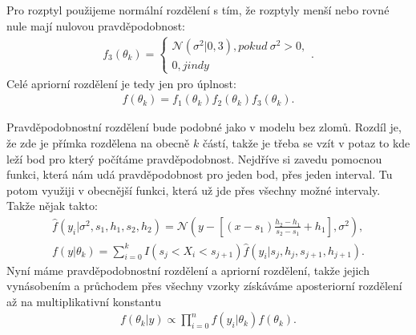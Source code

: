 \documentclass[czech,master,public,dept470,male,cpdeclaration,oneside, python]{diploma}
\begin{document}
Pro rozptyl použijeme normální rozdělení s tím, že rozptyly menší nebo rovné nule mají nulovou pravděpodobnost:
\begin{align}
f_3(\theta_k) = 
\begin{cases}
\mathcal{N}(\sigma^2 | 0, 3), pokud\  \sigma^2 > 0, \\
0, jindy
\end{cases}.
\end{align}
Celé apriorní rozdělení je tedy jen pro úplnost:
\begin{align}
f(\theta_k) = f_1(\theta_k)f_2(\theta_k)f_3(\theta_k).
\end{align} \par
Pravděpodobnostní rozdělení bude podobné jako v modelu bez zlomů. Rozdíl je, že zde je přímka rozdělena na obecně $k$ částí, takže je třeba se vzít v potaz to kde leží bod pro který počítáme pravděpodobnost. Nejdříve si zavedu pomocnou funkci, která nám udá pravděpodobnost pro jeden bod, přes jeden interval. Tu potom využiji v obecnější funkci, která už jde přes všechny možné intervaly. Takže nějak takto:
\begin{align}
\hat{f}(y_i | \sigma^2, s_1, h_1, s_2, h_2) = \mathcal{N}(y - [(x - s_1)\frac{h_2 - h_1}{s_2 - s_1} + h_1], \sigma^2), \\
f(y | \theta_k) = \sum_{i=0}^{k} I(s_j < X_i < s_{j+1}) 
\hat{f}(y_i | s_j, h_j, s_{j+1}, h_{j+1}).
\end{align}
Nyní máme pravděpodobnostní rozdělení a apriorní rozdělení, takže jejich vynásobením a průchodem přes všechny vzorky získáváme aposteriorní rozdělení až na multiplikativní konstantu
\begin{align}
f(\theta_k | y) \propto \prod_{i=0}^{n} f(y_i | \theta_k) f(\theta_k).
\end{align}
\end{document}
